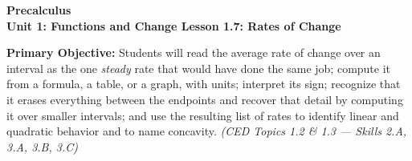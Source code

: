 \documentclass[10pt]{article}
\newcommand{\CourseName}{Precalculus}
\newcommand{\UnitNumberName}{Unit 1: Functions and Change \quad}
\newcommand{\LessonNumberName}{Lesson 1.7: Rates of Change}
\begin{document}
\begin{center}
    {\Large\bfseries \CourseName \\
    {\small\bfseries \UnitNumberName \LessonNumberName}}
\end{center}

\begin{tcolorbox}[colback=lilac, colframe=plum, boxrule=0.9pt, arc=2mm,
    left=2mm, right=2mm, top=1.5mm, bottom=1.5mm]
    \textbf{Primary Objective:} Students will read the average rate of change
    over an interval as the one \textit{steady} rate that would have done the
    same job; compute it from a formula, a table, or a graph, with units;
    interpret its sign; recognize that it erases everything between the
    endpoints and recover that detail by computing it over smaller intervals;
    and use the resulting list of rates to identify linear and quadratic
    behavior and to name concavity.
    \hfill\textit{\small (CED Topics 1.2 \& 1.3 --- Skills 2.A, 3.A, 3.B, 3.C)}
\end{tcolorbox}
\end{document}
